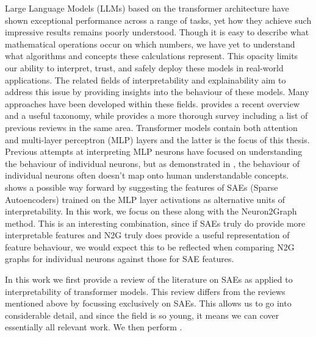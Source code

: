 \documentclass[../main.tex]{subfiles}
\begin{document}
Large Language Models (LLMs) based on the transformer architecture \citep{vaswani_attention_2023} have shown exceptional performance across a range of tasks, yet how they achieve such impressive results remains poorly understood.
Though it is easy to describe what mathematical operations occur on which numbers, we have yet to understand what algorithms and concepts these calculations represent.
This opacity limits our ability to interpret, trust, and safely deploy these models in real-world applications.
The related fields of interpretability and explainability aim to address this issue by providing insights into the behaviour of these models.
Many approaches have been developed within these fields.
\citet{bereska_mechanistic_2024} provides a recent overview and a useful taxonomy, while \citet{rauker_toward_2023} provides a more thorough survey including a list of previous reviews in the same area.
Transformer models contain both attention and multi-layer perceptron (MLP) layers and the latter is the focus of this thesis.
Previous attempts at interpreting MLP neurons have focused on understanding the behaviour of individual neurons, but as demonstrated in \citet{elhage_toy_2022}, the behaviour of individual neurons often doesn't map onto human understandable concepts.
\citet{bricken_towards_2023} shows a possible way forward by suggesting the features of SAEs (Sparse Autoencoders) trained on the MLP layer activations as alternative units of interpretability.
In this work, we focus on these along with the Neuron2Graph \citep{foote_neuron_2023} method.
This is an interesting combination, since if SAEs truly do provide more interpretable features and N2G truly does provide a useful representation of feature behaviour, we would expect this to be reflected when comparing N2G graphs for individual neurons against those for SAE features. 

In this work we first provide a review of the literature on SAEs as applied to interpretability of transformer models.
This review differs from the reviews mentioned above by focussing exclusively on SAEs.
This allows us to go into considerable detail, and since the field is so young, it means we can cover essentially all relevant work.
We then perform .
\end{document}
